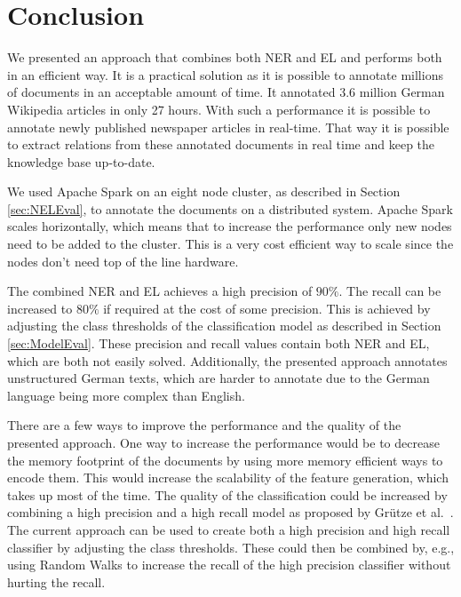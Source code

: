 \section{Conclusion}
\label{sec:Conclusion}
We presented an approach that combines both NER and EL and performs both in an efficient way. It is a practical solution as it is possible to annotate millions of documents in an acceptable amount of time. It annotated 3.6 million German Wikipedia articles in only 27 hours. With such a performance it is possible to annotate newly published newspaper articles in real-time. That way it is possible to extract relations from these annotated documents in real time and keep the knowledge base up-to-date.\par
We used Apache Spark on an eight node cluster, as described in Section \ref{sec:NELEval}, to annotate the documents on a distributed system. Apache Spark scales horizontally, which means that to increase the performance only new nodes need to be added to the cluster. This is a very cost efficient way to scale since the nodes don't need top of the line hardware.\par
The combined NER and EL achieves a high precision of $90\%$. The recall can be increased to $80\%$ if required at the cost of some precision. This is achieved by adjusting the class thresholds of the classification model as described in Section \ref{sec:ModelEval}. These precision and recall values contain both NER and EL, which are both not easily solved. Additionally, the presented approach annotates unstructured German texts, which are harder to annotate due to the German language being more complex than English.\par
There are a few ways to improve the performance and the quality of the presented approach. One way to increase the performance would be to decrease the memory footprint of the documents by using more memory efficient ways to encode them. This would increase the scalability of the feature generation, which takes up most of the time. The quality of the classification could be increased by combining a high precision and a high recall model as proposed by Grütze et al.\ \cite{coheel}. The current approach can be used to create both a high precision and high recall classifier by adjusting the class thresholds. These could then be combined by, e.g., using Random Walks to increase the recall of the high precision classifier without hurting the recall.
